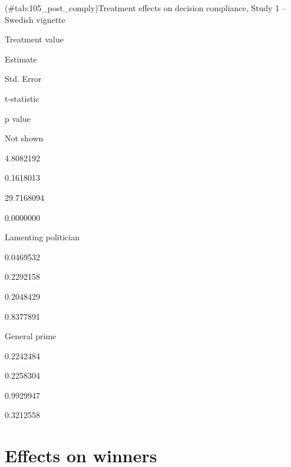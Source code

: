 \documentclass[]{book}
\begin{document}
(\#tab:105\_post\_comply)Treatment effects on decision compliance, Study
1 -- Swedish vignette

Treatment value

Estimate

Std. Error

t-statistic

p value

Not shown

4.8082192

0.1618013

29.7168094

0.0000000

Lamenting politician

0.0469532

0.2292158

0.2048429

0.8377891

General prime

0.2242484

0.2258304

0.9929947

0.3212558

\chapter{Effects on winners}\label{effects-on-winners}
\end{document}
